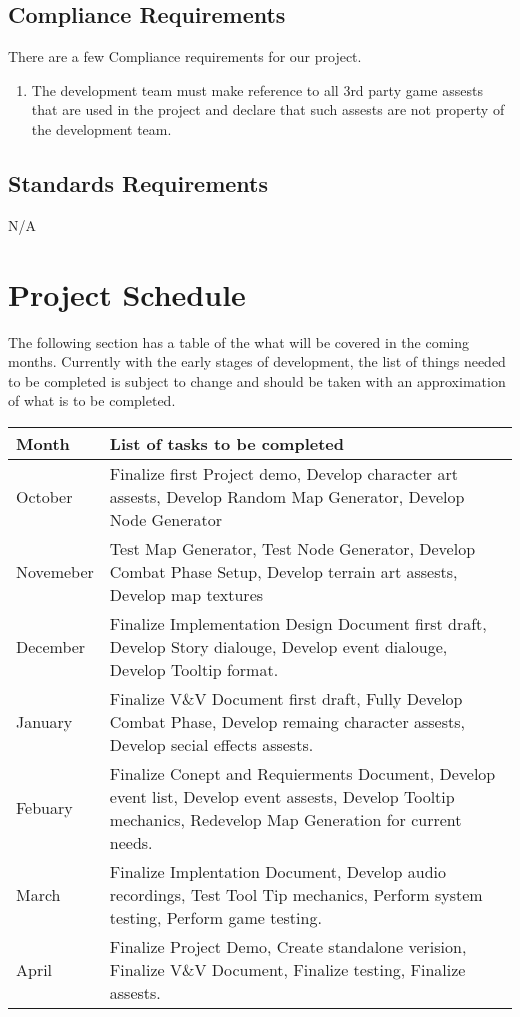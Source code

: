 \documentclass{article}
\begin{document}
\subsection{Compliance Requirements}
\quad There are a few Compliance requirements for our project.
\begin{enumerate}[{COMPR}1. ]
	\item The development team must make reference to all 3rd party game assests that are used in the project and declare that such assests are not property of the development team.
\end{enumerate}
\subsection{Standards Requirements}
\quad N/A %
\section{Project Schedule}
\quad The following section has a table of the what will be covered in the coming months. Currently with the early stages of development, the list of things needed to be completed is subject to change and should be taken with an approximation of what is to be completed.
\begin{center}
\begin{tabular}{ | m{5em} | m{10cm}|} 
\hline
Month & List of tasks to be completed \\ 
\hline
October & Finalize first Project demo, Develop character art assests, Develop Random Map Generator, Develop Node Generator \\ 
\hline
Novemeber & Test Map Generator, Test Node Generator, Develop Combat Phase Setup, Develop terrain art assests, Develop map textures \\ 
\hline
December & Finalize Implementation Design Document first draft, Develop Story dialouge, Develop event dialouge, Develop Tooltip format. \\ 
\hline
January &  Finalize V\&V Document first draft, Fully Develop Combat Phase, Develop remaing character assests, Develop secial effects assests. \\ 
\hline
Febuary & Finalize Conept and Requierments Document, Develop event list, Develop event assests, Develop Tooltip mechanics, Redevelop Map Generation for current needs. \\ 
\hline
March & Finalize Implentation Document, Develop audio recordings, Test Tool Tip mechanics, Perform system testing, Perform game testing.\\ 
\hline
April & Finalize Project Demo, Create standalone verision, Finalize V\&V Document, Finalize testing, Finalize assests. \\ 
\hline
\end{tabular}
\end{center}
\end{document}
